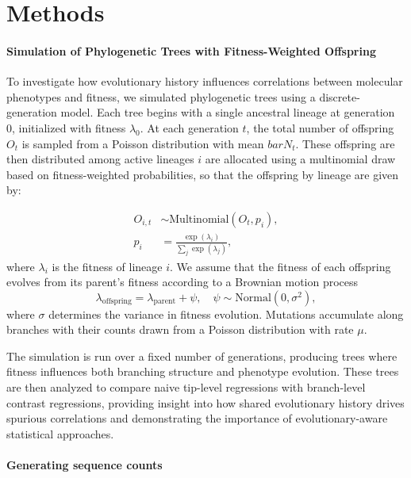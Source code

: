 \section{Methods}

\paragraph{Simulation of Phylogenetic Trees with Fitness-Weighted Offspring}%

To investigate how evolutionary history influences correlations between molecular phenotypes and fitness, we simulated phylogenetic trees using a discrete-generation model.
Each tree begins with a single ancestral lineage at generation 0, initialized with fitness $\lambda_0$.
At each generation $t$, the total number of offspring $O_{t}$ is sampled from a Poisson distribution with mean $bar{N}_t$.
These offspring are then distributed among active lineages $i$ are allocated using a multinomial draw based on fitness-weighted probabilities, so that the offspring by lineage are given by:

\begin{align*}
    O_{i, t} &\sim \text{Multinomial}\left(O_t, p_{i}\right),\\
    p_i &= \frac{\exp(\lambda_i)}{\sum_j \exp(\lambda_j)},
\end{align*}
where $\lambda_i$ is the fitness of lineage $i$.
We assume that the fitness of each offspring evolves from its parent’s fitness according to a Brownian motion process
\begin{equation*}
    \lambda_{\text{offspring}} = \lambda_{\text{parent}} + \psi, \quad \psi \sim \text{Normal}(0, \sigma^2),
\end{equation*}
where $\sigma$ determines the variance in fitness evolution.
Mutations accumulate along branches with their counts drawn from a Poisson distribution with rate $\mu$.

The simulation is run over a fixed number of generations, producing trees where fitness influences both branching structure and phenotype evolution.
These trees are then analyzed to compare naive tip-level regressions with branch-level contrast regressions, providing insight into how shared evolutionary history drives spurious correlations and demonstrating the importance of evolutionary-aware statistical approaches.

\paragraph{Generating sequence counts}%

